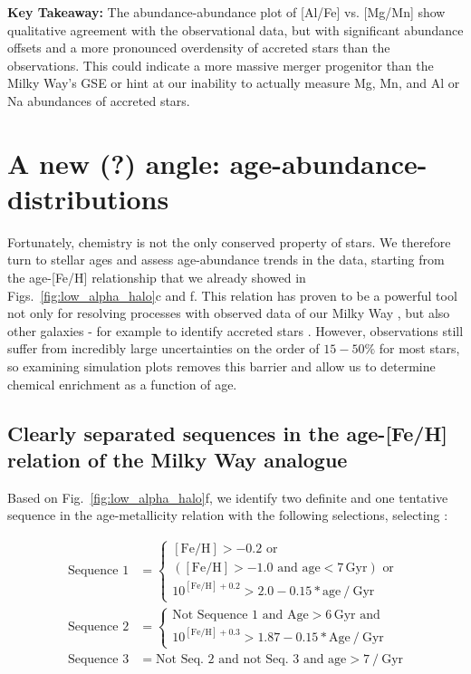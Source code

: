 \documentclass[fleqn,usenatbib]{mnras}
\begin{document}
\textbf{Key Takeaway:} The abundance-abundance plot of [Al/Fe] vs. [Mg/Mn] show qualitative agreement with the observational data, but with significant abundance offsets and a more pronounced overdensity of accreted stars than the observations. This could indicate a more massive merger progenitor than the Milky Way's GSE or hint at our inability to actually measure Mg, Mn, and Al or Na abundances of accreted stars.

\section{A new (?) angle: age-abundance-distributions}\label{sec:Age-abundance}

Fortunately, chemistry is not the only conserved property of stars. We therefore turn to stellar ages and assess age-abundance trends in the data, starting from the age-[Fe/H] relationship that we already showed in Figs.~\ref{fig:low_alpha_halo}c and f. This relation has proven to be a powerful tool not only for resolving processes with observed data of our Milky Way \citep[e.g.][]{Twarog1980, Edvardsson1993, Nordstroem2004, Casagrande2011, Feuillet2019, Xiang2022}, but also other galaxies - for example to identify accreted stars \citep[e.g.][]{Pinna2019b, Martig2021}. However, observations still suffer from incredibly large uncertainties on the order of $15-50\%$ for most stars, so examining simulation plots removes this barrier and allow us to determine chemical enrichment as a function of age.

\subsection{Clearly separated sequences in the age-[Fe/H] relation of the Milky Way analogue} \label{sec:sequences}

Based on Fig.~\ref{fig:low_alpha_halo}f, we identify two definite and one tentative sequence in the age-metallicity relation with the following selections, selecting :

\begin{align}
    \text{Sequence~1} &= \begin{cases}
        \mathrm{[Fe/H] > -0.2} \text{ or} \\
        (\mathrm{[Fe/H]} > -1.0 \text{ and } \mathrm{age} < 7\,\mathrm{Gyr}) \text{ or} \\
        10^{\mathrm{[Fe/H]} + 0.2} > 2.0 - 0.15*\mathrm{age}~/~\mathrm{Gyr}
    \end{cases} \label{eq:sequence1} \\
    \text{Sequence~2} &= \begin{cases}
        \text{Not Sequence~1 and }\mathrm{Age} > 6\,\mathrm{Gyr} \text{ and} \\
        10^{\mathrm{[Fe/H]} + 0.3} > 1.87 - 0.15*\mathrm{Age}~/~\mathrm{Gyr}
    \end{cases}  \label{eq:sequence2} \\
    \text{Sequence~3} &= \text{Not Seq.~2 and not Seq.~3 and } \mathrm{age} > 7~/~\mathrm{Gyr}  \label{eq:sequence3}
\end{align}
\end{document}
